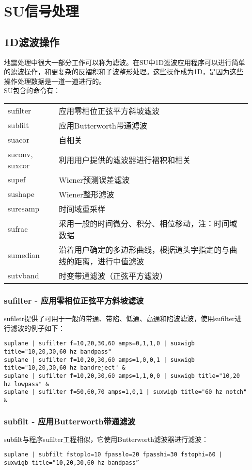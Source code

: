 \chapter{SU信号处理}
\section{1D滤波操作}
地震处理中很大一部分工作可以称为滤波。在SU中1D滤波应用程序可以进行简单的滤波操作，和更复杂的反褶积和子波整形处理。这些操作成为1D，是因为这些操作处理数据是一道一道进行的。\\
SU包含的命令有：\\
\begin{tabular}{ll}
	\toprule
	sufilter & 应用零相位正弦平方斜坡滤波\\	
	subfilt & 应用Butterworth带通滤波	\\
	suacor & 自相关	\\
	suconv, suxcor & 利用用户提供的滤波器进行褶积和相关	\\
	supef & Wiener预测误差滤波\\	
	sushape & Wiener整形滤波\\	
	suresamp & 时间域重采样	\\
	sufrac & 采用一般的时间微分、积分、相位移动，注：时间域数据\\	
	sumedian & 沿着用户确定的多边形曲线，根据道头字指定的与曲线的距离，进行中值滤波\\	
	sutvband & 时变带通滤波（正弦平方滤波）\\
	\bottomrule
\end{tabular}

\subsection{sufilter - 应用零相位正弦平方斜坡滤波}
sufiletr提供了可用于一般的带通、带陷、低通、高通和陷波滤波，使用sufilter进行滤波的例子如下：
\begin{lstlisting}
suplane | sufilter f=10,20,30,60 amps=0,1,1,0 | suxwigb title="10,20,30,60 hz bandpass" 
suplane | sufilter f=10,20,30,60 amps=1,0,0,1 | suxwigb title="10,20,30,60 hz bandreject" &
suplane | sufilter f=10,20,30,60 amps=1,1,0,0 | suxwigb title="10,20 hz lowpass" &
suplane | sufilter f=50,60,70 amps=1,0,1 | suxwigb title="60 hz notch" &
\end{lstlisting}

\subsection{subfilt - 应用Butterworth带通滤波 }
subfilt与程序sufilter工程相似，它使用Butterworth滤波器进行滤波：
\begin{lstlisting}
suplane | subfilt fstoplo=10 fpasslo=20 fpasshi=30 fstophi=60 | suxwigb title="10,20,30,60 hz bandpass” 
\end{lstlisting}

